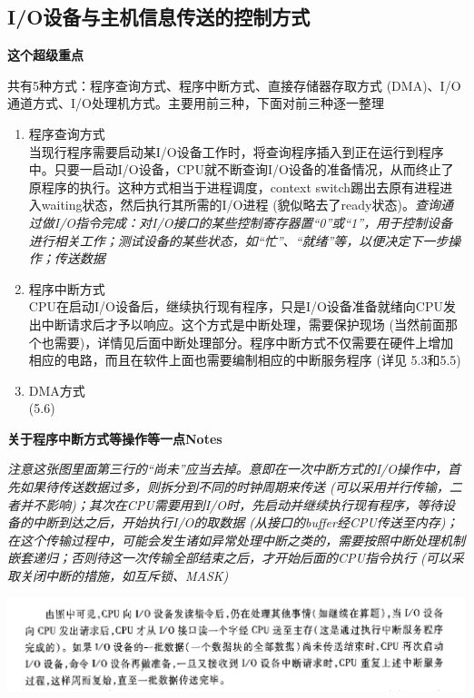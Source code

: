 \documentclass[]{report}
\begin{document}
			\subsection{I/O设备与主机信息传送的控制方式}\par
				\textbf{这个超级重点}\par
				共有5种方式：程序查询方式、程序中断方式、直接存储器存取方式 (DMA)、I/O通道方式、I/O处理机方式。主要用前三种，下面对前三种逐一整理\par
				\begin{enumerate}[label = (\arabic{*})]
					\item 程序查询方式\\当现行程序需要启动某I/O设备工作时，将查询程序插入到正在运行到程序中。只要一启动I/O设备，CPU就不断查询I/O设备的准备情况，从而终止了原程序的执行。这种方式相当于进程调度，context switch踢出去原有进程进入waiting状态，然后执行其所需的I/O进程 (貌似略去了ready状态)。\textit{查询通过做I/O指令完成：对I/O接口的某些控制寄存器置“0”或“1”，用于控制设备进行相关工作；测试设备的某些状态，如“忙”、“就绪”等，以便决定下一步操作；传送数据}
					\item 程序中断方式\\CPU在启动I/O设备后，继续执行现有程序，只是I/O设备准备就绪向CPU发出中断请求后才予以响应。这个方式是中断处理，需要保护现场 (当然前面那个也需要)，详情见后面中断处理部分。程序中断方式不仅需要在硬件上增加相应的电路，而且在软件上面也需要编制相应的中断服务程序 (详见 5.3和5.5)
					\item DMA方式\\ (5.6)
				\end{enumerate}
			\textbf{关于程序中断方式等操作等一点Notes}\par
				{\itshape 注意这张图里面第三行的“尚未”应当去掉。意即在一次中断方式的I/O操作中，首先如果待传送数据过多，则拆分到不同的时钟周期来传送 (可以采用并行传输，二者并不影响)；其次在CPU需要用到I/O时，先启动并继续执行现有程序，等待设备的中断到达之后，开始执行I/O的取数据 (从接口的buffer经CPU传送至内存)；在这个传输过程中，可能会发生诸如异常处理中断之类的，需要按照中断处理机制嵌套递归；否则待这一次传输全部结束之后，才开始后面的CPU指令执行 (可以采取关闭中断的措施，如互斥锁、MASK)}\par
				\includegraphics[scale = 0.25]{../pictures/recursive_interrupt.png}
\end{document}

